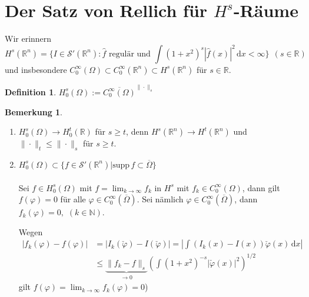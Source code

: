 \documentclass[
paper=a4,
bibtotocnumbered,
liststotocnumbered,
tablecaptionabove,
pointlessnumbers,
twoside,
openright,
10pt
]
{report}
\newcommand{\supp}{\mathrm{supp}\,}
\let\phi\varphi
\theoremstyle{definition}
\newtheorem*{df}{Definition}
\newtheorem*{rem}{Bemerkung}
\numberwithin{equation}{chapter}
\begin{document}
\section{Der Satz von Rellich für $H^s$-Räume}

Wir erinnern
\begin{equation}
H^s(\mathbb R^n) = \{I\in \mathcal S'(\mathbb R^n): \hat{f} \text{ regulär und } \int (1+x^2)^s |\hat{f}(x)|^2\, \mathrm dx <\infty\} \ \ (s\in \mathbb R) 
\end{equation}
und insbesondere $C_0^\infty(\Omega) \subset C_0^\infty(\mathbb R^n) \subset H^s(\mathbb R^n)$ für $s \in \mathbb{R}$.

\begin{df}
$H_0^s(\Omega) := \overline{C_0^\infty(\Omega)}^{\|\cdot\|_s}$
\end{df}
\begin{rem}
\begin{enumerate}
\item $H_0^s(\Omega) \to H_0^t (\mathbb R)$ für $s\ge t$, denn $H^s(\mathbb{R}^n) \rightarrow H^t(\mathbb R^n)$ und $\|\cdot \|_t \le \| \cdot \|_s$ für $s\ge t$.

\item $H_0^s(\Omega) \subset \{f\in \mathcal S'(\mathbb R^n)|\supp f\subset \overline{\Omega}\}$
\\
\\
Sei $f\in H_0^s(\Omega)$ mit $f=\lim_{k\to \infty} f_k$ in $H^s$ mit $f_k \in C_0^\infty(\Omega)$, dann gilt $f(\phi)=0$ für alle $\phi \in C_{0}^\infty(\overline{\Omega})$. Sei nämlich $\phi \in C_{0}^\infty(\overline{\Omega})$, dann $f_k(\phi) =0,$ $(k\in \mathbb N)$.

Wegen 
\begin{align*}
|f_k(\phi)-f(\phi)| &=|I_k(\check \phi) - I(\check \phi)| = |\int (I_k(x)-I(x))\check \phi(x)\, \mathrm dx|\\
 &\le \underbrace{\|f_k-f\|_s}_{\to 0} \left ( \int (1+x^2)^{-s} |\check \phi(x)|^2 \right )^{1/2}
\end{align*}
gilt $f(\phi) = \lim_{k\to \infty} f_k(\phi) =0$)
\end{enumerate}
\end{rem}
\end{document}
